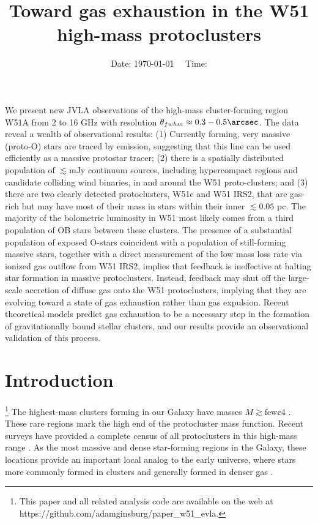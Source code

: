 




\newsavebox{\discard}
\sbox{\discard}{\vbox{\tableofcontents}}

\title{Toward gas exhaustion in the W51 high-mass protoclusters}


\date{Date: \today ~~ Time: \currenttime}

\abstract
{
We present new JVLA observations of the high-mass cluster-forming region W51A
from 2 to 16 GHz with resolution
$\theta_{fwhm}\approx0.3-0.5\arcsec$.  The data reveal a wealth of
observational results:
(1) Currently forming, very massive (proto-O) stars are traced by \ortho
\twotwo emission, suggesting that this line can be used efficiently as a
massive protostar tracer;
(2) there is a spatially distributed population of $\lesssim$mJy continuum sources,
including hypercompact \hii regions and candidate colliding wind binaries,
in and around the W51 proto-clusters;  and
(3) there are two clearly detected protoclusters, W51e and W51 IRS2, that are
gas-rich but may have most of their mass in stars within their inner $\lesssim0.05$
pc.  The
majority of the bolometric luminosity in W51 most likely comes from a third
population of OB stars between these clusters.
The presence of a substantial population of exposed O-stars coincident with
a population of still-forming massive stars, together with a direct measurement
of the low mass loss rate via ionized gas outflow from W51 IRS2, implies
that feedback is ineffective at halting star formation in massive
protoclusters.  Instead, feedback may shut off the large-scale accretion of
diffuse gas onto the W51 protoclusters, implying that they are evolving toward
a state of gas exhaustion rather than gas expulsion. Recent theoretical models
predict gas exhaustion to be a necessary step in the formation of
gravitationally bound stellar clusters, and our results provide an
observational validation of this process.
}

\maketitle


\section{Introduction}
\footnote{
This paper and all related analysis code are available on the web at
https://github.com/adamginsburg/paper\_w51\_evla.
}
The highest-mass clusters forming in our Galaxy have masses
$M\gtrsim\textrm{few}\ee{4}$ \msun \citep{Portegies-Zwart2010a}.
These rare regions mark the high end of the protocluster mass function.
Recent surveys have provided a complete census of all protoclusters in this
high-mass range \citep{Ginsburg2012a,Urquhart2013b,Urquhart2014b}.  As the
most massive and dense star-forming regions in the Galaxy, these locations
provide an important local analog to the early universe, where stars more
commonly formed in clusters and generally formed in denser gas
\citep{Kruijssen2012a,Madau2014a}.

